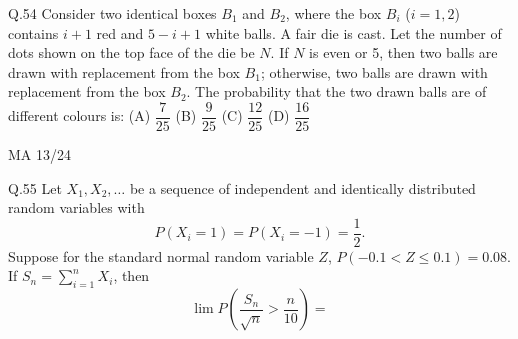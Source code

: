 \documentclass{article}
\begin{document}
																																																																																																							      Q.54 \quad Consider two identical boxes $B_1$ and $B_2$, where the box $B_i$ ($i=1,2$) contains $i+1$ red and $5 - i + 1$ white balls. A fair die is cast. Let the number of dots shown on the top face of the die be $N$. If $N$ is even or 5, then two balls are drawn with replacement from the box $B_1$; otherwise, two balls are drawn with replacement from the box $B_2$. The probability that the two drawn balls are of different colours is:
																																																																																																							       \vspace{1em}   \newline 
																																																																																																							       (A) $\dfrac{7}{25}$ \hspace{2cm}(B) $\dfrac{9}{25}$ \hspace{2cm} (C) $\dfrac{12}{25}$ \hspace{2cm} (D) $\dfrac{16}{25}$  

																																																																																																							       \vspace{20em}
																																																																																																							       \begin{center}
																																																																																																							           {MA 13/24}
																																																																																																								   \end{center}
																																																																																																								   \newpage
																																																																																																								   Q.55 \quad Let $X_1, X_2, \ldots$ be a sequence of independent and identically distributed random variables with
																																																																																																								   \[
																																																																																																								   P(X_i = 1) = P(X_i = -1) = \frac{1}{2}.
																																																																																																								   \]
																																																																																																								   Suppose for the standard normal random variable $Z$, $P(-0.1 < Z \leq 0.1) = 0.08$. If $S_n = \sum_{i=1}^{n} X_i$, then
																																																																																																								   \[
																																																																																																								   \lim P\left(\frac{S_n}{\sqrt{n}} > \frac{n}{10}\right) =
																																																																																																								   \]
\end{document}
